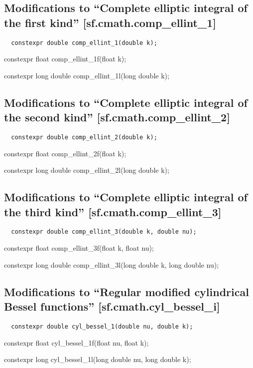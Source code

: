 \documentclass[prd,twocolumn,amsmath,amssymb,nofootinbib,eqsecnum]{revtex4-1}
\newcommand{\code}[1]{{\tt #1}}
\newcommand{\highlight}[1]{{\color{red} #1}}
\newcommand{\bigund}{{\Huge{\_}}}
\begin{document}
\subsection{Modifications to  ``Complete elliptic integral of the first kind''  [sf.cmath.comp{\bigund}ellint{\bigund}1]}

\code{
	\highlight{constexpr} double comp\_ellint\_1(double k);
	
	\highlight{constexpr} float comp\_ellint\_1f(float k);
	
	\highlight{constexpr} long double comp\_ellint\_1l(long double k);

}

\subsection{Modifications to  ``Complete elliptic integral of the second kind''  [sf.cmath.comp{\bigund}ellint{\bigund}2]}

\code{
	\highlight{constexpr} double comp\_ellint\_2(double k);
	
	\highlight{constexpr} float comp\_ellint\_2f(float k);
	
	\highlight{constexpr} long double comp\_ellint\_2l(long double k);

}

\subsection{Modifications to  ``Complete elliptic integral of the third kind''  [sf.cmath.comp{\bigund}ellint{\bigund}3]}

\code{
	\highlight{constexpr} double comp\_ellint\_3(double k, double nu);
	
	\highlight{constexpr} float comp\_ellint\_3f(float k, float nu);
	
	\highlight{constexpr} long double comp\_ellint\_3l(long double k, long double nu);

}

\subsection{Modifications to  ``Regular modified cylindrical Bessel functions''  [sf.cmath.cyl{\bigund}bessel{\bigund}i]}

\code{
	\highlight{constexpr} double cyl\_bessel\_1(double nu, double k);
	
	\highlight{constexpr} float cyl\_bessel\_1f(float nu, float k);
	
	\highlight{constexpr} long cyl\_bessel\_1l(long double nu, long double k);

}
\end{document}

